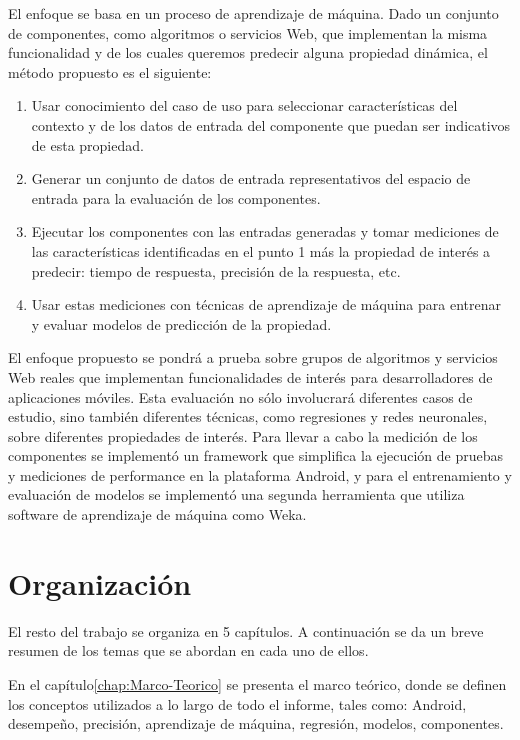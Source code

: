 El enfoque se basa en un proceso de aprendizaje de máquina. Dado un
conjunto de componentes, como algoritmos o servicios Web, que implementan
la misma funcionalidad y de los cuales queremos predecir alguna propiedad
dinámica, el método propuesto es el siguiente: 
\begin{enumerate}
\item Usar conocimiento del caso de uso para seleccionar características
del contexto y de los datos de entrada del componente que puedan ser
indicativos de esta propiedad. 
\item Generar un conjunto de datos de entrada representativos del espacio
de entrada para la evaluación de los componentes. 
\item Ejecutar los componentes con las entradas generadas y tomar mediciones
de las características identificadas en el punto 1 más la propiedad
de interés a predecir: tiempo de respuesta, precisión de la respuesta,
etc. 
\item Usar estas mediciones con técnicas de aprendizaje de máquina para
entrenar y evaluar modelos de predicción de la propiedad. 
\end{enumerate}
El enfoque propuesto se pondrá a prueba sobre grupos de algoritmos
y servicios Web reales que implementan funcionalidades de interés
para desarrolladores de aplicaciones móviles. Esta evaluación no sólo
involucrará diferentes casos de estudio, sino también diferentes técnicas,
como regresiones y redes neuronales, sobre diferentes propiedades
de interés. Para llevar a cabo la medición de los componentes se implementó
un framework que simplifica la ejecución de pruebas y mediciones de
performance en la plataforma Android, y para el entrenamiento y evaluación
de modelos se implementó una segunda herramienta que utiliza software
de aprendizaje de máquina como Weka\cite{Hall2009}.


\section{Organización\label{sec:Organizaci=0000F3n}}

El resto del trabajo se organiza en 5 capítulos. A continuación se
da un breve resumen de los temas que se abordan en cada uno de ellos. 

En el capítulo\ref{chap:Marco-Teorico} se presenta el marco teórico,
donde se definen los conceptos utilizados a lo largo de todo el informe,
tales como: Android, desempeño, precisión, aprendizaje de máquina,
regresión, modelos, componentes. 


